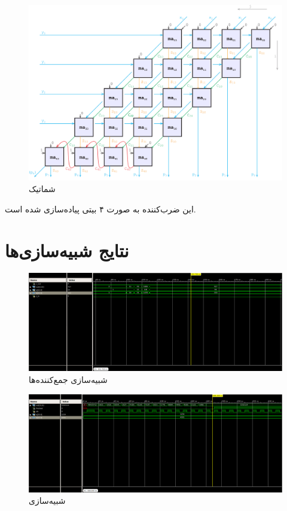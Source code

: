 \documentclass{article}
\begin{document}
\begin{figure}[H]
\centering
\includegraphics[width=12cm]{carry-save-mul-schem}
\caption{شماتیک }
\label{fig:carry-save-mul-schem}
\end{figure}
این ضرب‌کننده به صورت ۴ بیتی پیاده‌سازی شده است.

\pagebreak
\appendix
\section{نتایج شبیه‌سازی‌ها}
\begin{figure}[H]
\centering
\includegraphics[width=16cm]{adders-tb}
\caption{شبیه‌سازی جمع‌کننده‌ها}
\end{figure}


\begin{figure}[H]
\centering
\includegraphics[width=16cm]{shift-add-mul-tb}
\caption{شبیه‌سازی }
\end{figure}
\end{document}
